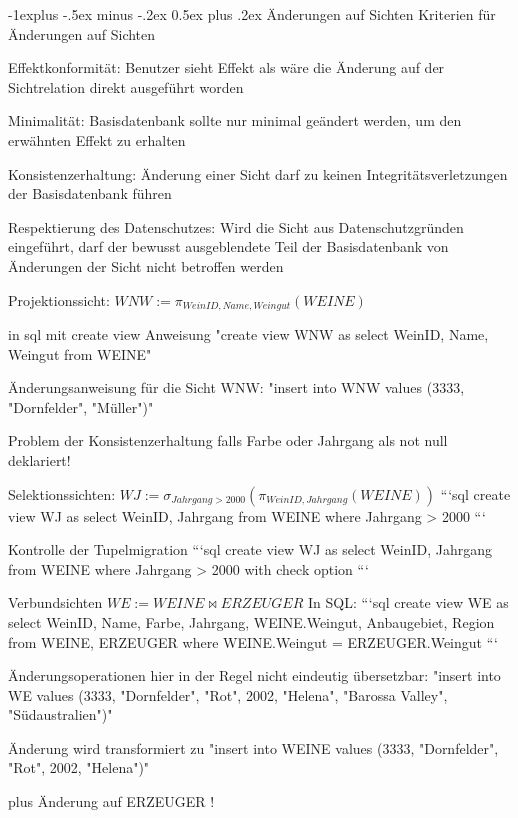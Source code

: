 \documentclass[a4paper]{article}
\makeatletter
\renewcommand{\subsection}{\@startsection{subsection}{2}{0mm}%
                                {-1explus -.5ex minus -.2ex}%
                                {0.5ex plus .2ex}%
                                {\normalfont\normalsize\bfseries}}
\makeatother
\begin{document}
\begin{multicols}{3}
\begin{itemize*}
        \subsection{Änderungen auf Sichten}
        Kriterien für Änderungen auf Sichten
        \begin{itemize*}
            \item Effektkonformität: Benutzer sieht Effekt als wäre die Änderung auf der Sichtrelation direkt ausgeführt worden
            \item Minimalität: Basisdatenbank sollte nur minimal geändert werden, um den erwähnten Effekt zu erhalten
            \item Konsistenzerhaltung: Änderung einer Sicht darf zu keinen Integritätsverletzungen der Basisdatenbank führen
            \item Respektierung des Datenschutzes: Wird die Sicht aus Datenschutzgründen eingeführt, darf der bewusst ausgeblendete Teil der Basisdatenbank von Änderungen der Sicht nicht betroffen werden
        \end{itemize*}

        Projektionssicht: $WNW:=\pi_{WeinID, Name, Weingut}(WEINE)$
        \begin{itemize*}
            \item in sql mit create view Anweisung
            "create view WNW as select WeinID, Name, Weingut from WEINE"
            \item Änderungsanweisung für die Sicht WNW:
            "insert into WNW values (3333, "Dornfelder", "Müller")"
            \item Problem der Konsistenzerhaltung falls Farbe oder Jahrgang als not null deklariert!
        \end{itemize*}

        Selektionssichten: $WJ:=\sigma_{Jahrgang>2000}(\pi_{WeinID, Jahrgang}(WEINE))$
        ```sql
        create view WJ as
        select WeinID, Jahrgang
        from WEINE
        where Jahrgang > 2000
        ```

        Kontrolle der Tupelmigration
        ```sql
        create view WJ as
        select WeinID, Jahrgang
        from WEINE
        where Jahrgang > 2000
        with check option
        ```

        Verbundsichten $WE := WEINE \bowtie ERZEUGER$
        In SQL:
        ```sql
        create view WE as
        select WeinID, Name, Farbe, Jahrgang,
        WEINE.Weingut, Anbaugebiet, Region
        from WEINE, ERZEUGER
        where WEINE.Weingut = ERZEUGER.Weingut
        ```
        \begin{itemize*}
            \item Änderungsoperationen hier in der Regel nicht eindeutig übersetzbar:
            "insert into WE values (3333, "Dornfelder", "Rot", 2002, "Helena", "Barossa Valley", "Südaustralien")"
            \item Änderung wird transformiert zu
            "insert into WEINE values (3333, "Dornfelder", "Rot", 2002, "Helena")"
            \item plus Änderung auf ERZEUGER !
        \end{itemize*}


\end{itemize*}
\end{multicols}
\end{document}
